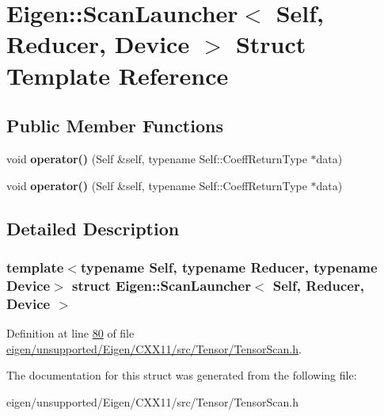 \hypertarget{struct_eigen_1_1_scan_launcher}{}\section{Eigen\+:\+:Scan\+Launcher$<$ Self, Reducer, Device $>$ Struct Template Reference}
\label{struct_eigen_1_1_scan_launcher}
\subsection*{Public Member Functions}
\begin{DoxyCompactItemize}
\item 
\mbox{\label{struct_eigen_1_1_scan_launcher_a47093017d60d96679d8f0faf822398f2}} 
void {\bfseries operator()} (Self \&self, typename Self\+::\+Coeff\+Return\+Type $\ast$data)
\item 
\mbox{\label{struct_eigen_1_1_scan_launcher_a47093017d60d96679d8f0faf822398f2}} 
void {\bfseries operator()} (Self \&self, typename Self\+::\+Coeff\+Return\+Type $\ast$data)
\end{DoxyCompactItemize}


\subsection{Detailed Description}
\subsubsection*{template$<$typename Self, typename Reducer, typename Device$>$\newline
struct Eigen\+::\+Scan\+Launcher$<$ Self, Reducer, Device $>$}



Definition at line \hyperlink{eigen_2unsupported_2_eigen_2_c_x_x11_2src_2_tensor_2_tensor_scan_8h_source_l00080}{80} of file \hyperlink{eigen_2unsupported_2_eigen_2_c_x_x11_2src_2_tensor_2_tensor_scan_8h_source}{eigen/unsupported/\+Eigen/\+C\+X\+X11/src/\+Tensor/\+Tensor\+Scan.\+h}.



The documentation for this struct was generated from the following file\+:\begin{DoxyCompactItemize}
\item 
eigen/unsupported/\+Eigen/\+C\+X\+X11/src/\+Tensor/\+Tensor\+Scan.\+h\end{DoxyCompactItemize}
